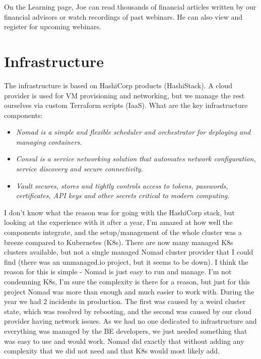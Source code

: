 \begin{example}[Education]
    On the Learning page, Joe can read thousands of financial articles written by our financial advisors or watch recordings of past webinars. He can also view and register for upcoming webinars.
\end{example}



\section{Infrastructure}
The infrastructure is based on HashiCorp products (HashiStack). A cloud provider is used for VM provisioning and networking, but we manage the rest ourselves via custom Terraform scripts (IaaS). What are the key infrastructure components:
\begin{itemize}
    \item \it{Nomad} is a simple and flexible scheduler and orchestrator for deploying and managing containers. \cite{NOMAD}
    \item \it{Consul} is a service networking solution that automates network configuration, service discovery and secure connectivity. \cite{CONSUL}
    \item \it{Vault} secures, stores and tightly controls access to tokens, passwords, certificates, API keys and other secrets critical to modern computing. \cite{VAULT}
\end{itemize}

I don't know what the reason was for going with the HashiCorp stack, but looking at the experience with it after a year, I'm amazed at how well the components integrate, and the setup/management of the whole cluster was a breeze compared to Kubernetes (K8s). There are now many managed K8s clusters available, but not a single managed Nomad cluster provider that I could find (there was an unmanaged.io project, but it seems to be down). I think the reason for this is simple - Nomad is just easy to run and manage. I'm not condemning K8s, I'm sure the complexity is there for a reason, but just for this project Nomad was more than enough and much easier to work with. During the year we had 2 incidents in production. The first was caused by a weird cluster state, which was resolved by rebooting, and the second was caused by our cloud provider having network issues. As we had no one dedicated to infrastructure and everything was managed by the BE developers, we just needed something that was easy to use and would work. Nomad did exactly that without adding any complexity that we did not need and that K8s would most likely add.

